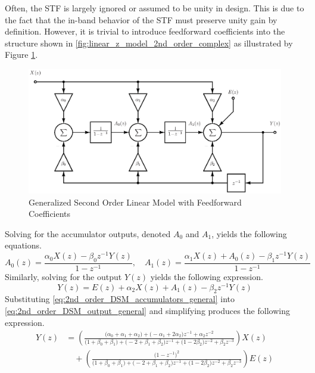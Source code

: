 Often, the STF is largely ignored or assumed to be unity in \DSm design. This is due to
the fact that the in-band behavior of the STF must preserve unity gain by definition. 
However, it is trivial to introduce feedforward coefficients into the structure shown in
\ref{fig:linear_z_model_2nd_order_complex} as illustrated by Figure
\ref{fig:general_2nd_order}.
\begin{figure}
  \centering
  \includegraphics[width=\textwidth]{./final_figures/general_2nd_order.eps}
  \caption{Generalized Second Order Linear Model with Feedforward Coefficients}
  \label{fig:general_2nd_order}
\end{figure}
Solving for the accumulator outputs, denoted $A_{0}$ and $A_{1}$, yields
the following equations.
\begin{equation}\label{eq:2nd_order_DSM_accumulators_general}
  A_{0}(z) = \frac{\alpha_0 X(z)-\beta_0 z^{-1}Y(z)}{1-z^{-1}} ,\quad
  A_{1}(z) = \frac{\alpha_1 X(z)+ A_{0}(z)-\beta_1 z^{-1}Y(z)}{1-z^{-1}}
\end{equation}
Similarly, solving for the output $Y(z)$ yields the following expression.
\begin{equation}\label{eq:2nd_order_DSM_output_general}
 Y(z)=E(z)+\alpha_2 X(z)+A_1(z)-\beta_2 z^{-1}Y(z)
\end{equation}
Substituting \eqref{eq:2nd_order_DSM_accumulators_general} into
\eqref{eq:2nd_order_DSM_output_general} and simplifying produces the following expression.
\begin{equation}\label{eq:2nd_order_DSM_output_general_2}
\begin{split}
 Y(z)&=\left(\frac{
\bigl(\alpha_0+\alpha_1+\alpha_2\bigr)+\bigl(-\alpha_1+2\alpha_2\bigr)z^{-1}+\alpha_2
z^{-2}}
{\bigl(1+\beta_0+\beta_1\bigr)+\bigl(-2+\beta_1+\beta_2\bigr)z^{-1}+\bigl(1-2\beta_2\bigr)
z^{-2}+\beta_2z^{-3}}\right) X(z)\\
&\quad + \left(\frac{\bigl(1-z^{-1}\bigr)^2}
 {\bigl(1+\beta_0+\beta_1\bigr)+\bigl(-2+\beta_1+\beta_2\bigr)z^{-1}
+\bigl(1-2\beta_2\bigr)
z^{-2}+\beta_2z^{-3}}\right)E(z) 
\end{split}
\end{equation}
